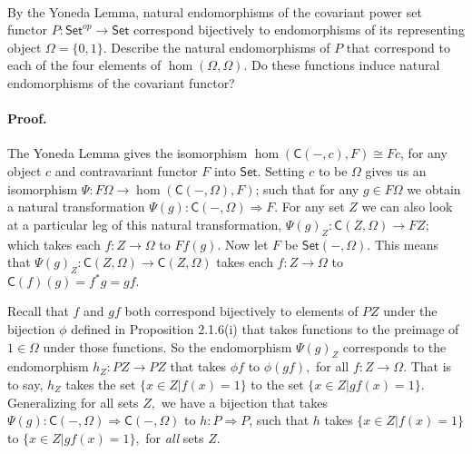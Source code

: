 \documentclass[main.tex]{subfiles}
\begin{document}
	\paragraph{}

	\begin{exercise}
	By the Yoneda Lemma, natural endomorphisms of the covariant power set
	functor \(P: \textsf{Set}^{op} \to \textsf{Set}\) correspond
	bijectively to endomorphisms of its representing object \(\Omega = \{0,
	1\}\). Describe the natural endomorphisms of \(P\) that correspond to
	each of the four elements of \(\hom(\Omega, \Omega)\). Do these
	functions induce natural endomorphisms of the covariant functor?	
\end{exercise}
	
	\paragraph{Proof.} The Yoneda Lemma gives the isomorphism $
	\hom(\mathsf{C}(-,c), F) \cong Fc $, for any object $ c $ and
	contravariant functor $ F $ into $ \mathsf{Set} $. Setting $ c $ to be
	$ \Omega $ gives us an isomorphism $ \Psi: F\Omega \to
	\hom(\mathsf{C}(-,\Omega), F) $; such that for any $ g \in F\Omega $ we
	obtain a natural transformation $ \Psi(g): \mathsf{C}(-,\Omega)
	\Rightarrow F. $ For any set $ Z $ we can also look at a particular leg
	of this natural transformation, $ \Psi(g)_Z: \mathsf{C}(Z,\Omega) \to
	FZ; $ which takes each $ f: Z \to \Omega $ to $ Ff(g). $ Now let $ F $
	be $ \mathsf{Set}(-, \Omega). $ This means that $ \Psi(g)_Z:
	\mathsf{C}(Z,\Omega) \to  \mathsf{C}(Z,\Omega) $ takes each $ f: Z \to
	\Omega $ to $ \mathsf{C}(f)(g) = f^*g = gf. $
	
	Recall that $ f $ and $ gf $ both correspond bijectively to elements of
	$ PZ $ under the bijection $ \phi $ defined in Proposition 2.1.6(i)
	that takes functions to the preimage of $ 1 \in \Omega $ under those
	functions. So the endomorphism $ \Psi(g)_Z $ corresponds to the
	endomorphism $ h_Z: PZ \to PZ $ that takes $ \phi f $ to $ \phi (gf), $
	for all $ f: Z \to \Omega. $ That is to say, $ h_Z $ takes the set $
	\{x \in Z | f(x) = 1\} $ to the set $ \{x \in Z | gf(x) = 1\}. $
	Generalizing for all sets $ Z, $ we have a bijection that takes $
	\Psi(g): \mathsf{C}(-,\Omega) \Rightarrow \mathsf{C}(-,\Omega) $ to $
	h: P \Rightarrow P $, such that $ h $ takes $ \{x \in Z | f(x) = 1\} $
	to $ \{x \in Z | gf(x) = 1\}, $ for \textit{all} sets $ Z. $ 
	
\end{document}
